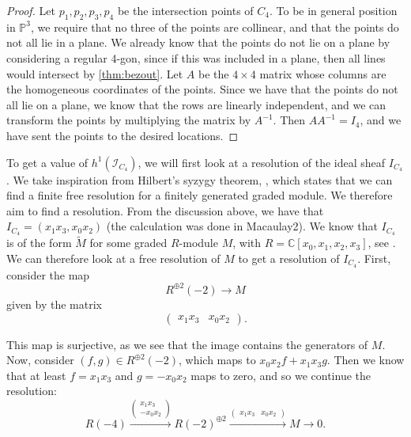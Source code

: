 \begin{proof}
    Let $p_1, p_2, p_3, p_4$ be the intersection points of $C_4$. To be in general position in $\mathbb{P}^3$, we require that no three of the points are collinear, and that the points do not all lie in a plane. We already know that the points do not lie on a plane by considering a regular 4-gon, since if this was included in a plane, then all lines would intersect by \cref{thm:bezout}.
    Let $A$ be the $4 \times 4$ matrix whose columns are the homogeneous coordinates of the points. Since we have that the points do not all lie on a plane, we know that the rows are linearly independent, and we can transform the points by multiplying the matrix by $A^{-1}$. Then $AA^{-1} = I_4$, and we have sent the points to the desired locations.
\end{proof}

To get a value of $h^1(\mathcal{I}_{C_4})$, we will first look at a resolution of the ideal sheaf $I_{C_4}$. We take inspiration from Hilbert's syzygy theorem, \cite[Theorem 19.12]{EO25}, which states that we can find a finite free resolution for a finitely generated graded module. We therefore aim to find a resolution. From the discussion above, we have that $I_{C_4} = (x_1x_3, x_0x_2)$ (the calculation was done in Macaulay2). We know that $I_{C_4}$ is of the form $\tilde{M}$ for some graded $R$-module $M$, with $R = \mathbb{C}[x_0, x_1, x_2, x_3]$, see \cite[Theorem 19.5]{EO25}. We can therefore look at a free resolution of $M$ to get a resolution of $I_{C_4}$. First, consider the map
\[R^{\oplus 2}(-2) \to M\]
given by the matrix 
\[\begin{pmatrix}
    x_1x_3 & x_0x_2
\end{pmatrix}.\]

This map is surjective, as we see that the image contains the generators of $M$. Now, consider $(f,g) \in R^{\oplus 2}(-2)$, which maps to $x_0x_2f + x_1x_3g$. Then we know that at least $f=x_1x_3$ and $g = -x_0x_2$ maps to zero, and so we continue the resolution:
\[R(-4) \xrightarrow{\begin{pmatrix}
    x_1x_3 \\
    -x_0x_2
\end{pmatrix}} R(-2)^{\oplus 2} \xrightarrow{\begin{pmatrix}
    x_1x_3 & x_0x_2
\end{pmatrix}} M \to 0.\]

